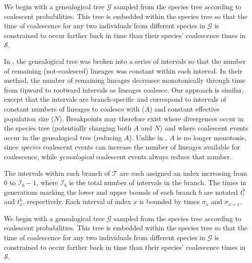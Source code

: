 \documentclass[11pt]{article}
\begin{document}
We begin with a genealogical tree $\mathcal{G}$ sampled from the species tree according 
to coalescent probabilities. This tree is embedded within the species tree so that the 
time of coalescence for any two individuals from different species in $\mathcal{G}$ 
is constrained to occur farther back in time than their species' coalescence times 
in $\mathcal{S}$.

In \citet{deng_distribution_2021}, the genealogical tree was broken into a series of 
intervals so that the number of remaining (not-coalesced) lineages was constant within
each interval. In their method, the number of remaining lineages decreases monotonically
through time from tipward to rootward intervals as lineages coalesce. Our approach is 
similar, except that the intervals are branch-specific and correspond to intervals of 
constant numbers of lineages to coalesce with ($A$) and constant effective population 
size ($N$). Breakpoints may therefore exist where divergences occur in the species 
tree (potentially changing both $A$ and $N$) and where coalescent events occur in 
the genealogical tree (reducing $A$). Unlike in \citet{deng_distribution_2021}, $A$ 
is no longer monotonic, since \emph{species} coalescent events can increase the number
of lineages available for coalescence, while \emph{genealogical} coalescent events
always reduce that number. 

The intervals within each branch of $\mathcal{T}$ are each assigned an index increasing
from $0$ to $\mathcal{I}_b-1$, where $\mathcal{I}_b$ is the total number of intervals
in the branch. The times in generations marking the lower and upper bounds of each 
branch $b$ are notated $t_l^b$ and $t_u^b$, respectively. Each interval of index $x$
is bounded by times $\sigma_x$ and $\sigma_{x+1}$.

We begin with a genealogical tree $\mathcal{G}$ sampled from the species tree according to coalescent probabilities. This tree is embedded within the species tree so that the time of coalescence for any two individuals from different species in $\mathcal{G}$ is constrained to occur farther back in time than their species' coalescence times in $\mathcal{S}$.
\end{document}
